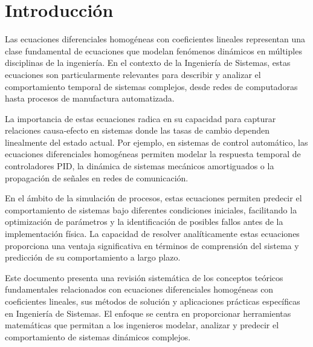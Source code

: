 \section{Introducción}

Las ecuaciones diferenciales homogéneas con coeficientes lineales representan una clase fundamental de ecuaciones que modelan fenómenos dinámicos en múltiples disciplinas de la ingeniería. En el contexto de la Ingeniería de Sistemas, estas ecuaciones son particularmente relevantes para describir y analizar el comportamiento temporal de sistemas complejos, desde redes de computadoras hasta procesos de manufactura automatizada.

La importancia de estas ecuaciones radica en su capacidad para capturar relaciones causa-efecto en sistemas donde las tasas de cambio dependen linealmente del estado actual. Por ejemplo, en sistemas de control automático, las ecuaciones diferenciales homogéneas permiten modelar la respuesta temporal de controladores PID, la dinámica de sistemas mecánicos amortiguados o la propagación de señales en redes de comunicación.

En el ámbito de la simulación de procesos, estas ecuaciones permiten predecir el comportamiento de sistemas bajo diferentes condiciones iniciales, facilitando la optimización de parámetros y la identificación de posibles fallos antes de la implementación física. La capacidad de resolver analíticamente estas ecuaciones proporciona una ventaja significativa en términos de comprensión del sistema y predicción de su comportamiento a largo plazo.

Este documento presenta una revisión sistemática de los conceptos teóricos fundamentales relacionados con ecuaciones diferenciales homogéneas con coeficientes lineales, sus métodos de solución y aplicaciones prácticas específicas en Ingeniería de Sistemas. El enfoque se centra en proporcionar herramientas matemáticas que permitan a los ingenieros modelar, analizar y predecir el comportamiento de sistemas dinámicos complejos.
